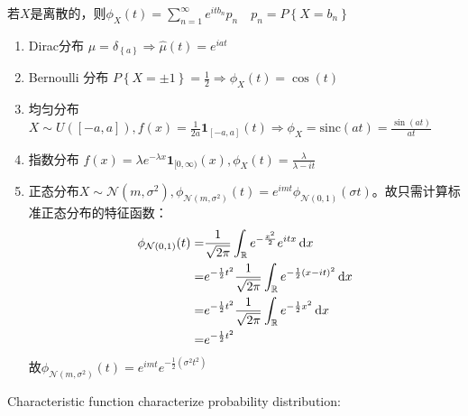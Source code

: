 \documentclass{ctexart}
\begin{document}
\begin{Eg}
  若$X$是离散的，则$\phi_X(t)=\sum_{n=1}^{\infty}e^{itb_n}p_n \quad p_n=P \left\{ X=b_n \right\}$
  
\begin{enumerate}
\item Dirac分布 $\mu=\delta_{ \left\{ a \right\}}\Rightarrow \hat{\mu}(t)=e^{iat}$
\item Bernoulli 分布 $P \left\{ X=\pm 1 \right\}= \frac{1}{2}\Rightarrow\phi_X(t)=\cos(t)$
\item 均匀分布 $X\sim U([-a,a]), f(x)=\frac{1}{2a} \mathbf{1}_{\left[ -a,a \right]}(t)\Rightarrow \phi_X=\mathrm{sinc}(at)=\frac{\sin(at)}{at}$
\item 指数分布 $f(x)=\lambda e^{-\lambda x}\mathbf{1}_{[0,\infty)}(x), \phi_X(t)=\frac{\lambda}{\lambda-it}$
\item 正态分布$X\sim \mathcal{N}(m,\sigma^2), \phi_{\mathcal{N}(m,\sigma^2)}(t)=e^{imt}\phi_{\mathcal{N}(0,1)}(\sigma t)$。故只需计算标准正态分布的特征函数： 
\begin{align}
  \phi_{\mathcal{N}(0,1)}(t)=&\frac{1}{\sqrt{2\pi}}\int_{\mathbb{R}}e^{-\frac{x^2}{2}}e^{itx}\,\mathrm{d} x\\
  =&e^{-\frac{1}{2}t^2}\frac{1}{\sqrt{2\pi}}\int_{\mathbb{R}}e^{-\frac{1}{2}(x-it)^2}\,\mathrm{d} x\\
  =&e^{-\frac{1}{2}t^2}\frac{1}{\sqrt{2\pi}}\int_{\mathbb{R}}e^{-\frac{1}{2}x^2}\,\mathrm{d} x\\
  =&e^{-\frac{1}{2}t^2}
\end{align}
故$\phi_{\mathcal{N}(m,\sigma^2)}(t)=e^{imt}e^{-\frac{1}{2}(\sigma^2 t^2)}$
\end{enumerate}
\end{Eg}

Characteristic function characterize probability distribution:
\end{document}
